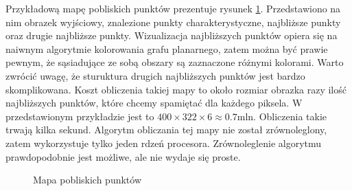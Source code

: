 \documentclass[a4paper,12pt,leqno]{article}
\begin{document}
Przykładową mapę pobliskich punktów prezentuje rysunek \ref{proxmap}. Przedstawiono na nim obrazek wyjściowy, znalezione punkty charakterystyczne, najbliższe punkty oraz drugie najbliższe
punkty. Wizualizacja najbliższych punktów opiera się na naiwnym algorytmie kolorowania grafu planarnego, zatem można być prawie pewnym, że sąsiadujące ze sobą obszary są zaznaczone
różnymi kolorami. Warto zwrócić uwagę, że sturuktura drugich najbliższych punktów jest bardzo skomplikowana. Koszt obliczenia takiej mapy to około rozmiar obrazka razy ilość najbliższych
punktów, które chcemy spamiętać dla każdego piksela. W przedstawionym przykładzie jest to $400 \times 322 \times 6 \approx 0.7 \text{mln}$. Obliczenia takie trwają kilka sekund. Algorytm 
obliczania tej mapy nie został zrównoleglony, zatem wykorzystuje tylko jeden rdzeń procesora. Zrównoleglenie algorytmu prawdopodobnie jest możliwe, ale nie wydaje się proste.

\begin{figure}\centering
{}\hspace{1mm}
\hspace{1mm}
\hspace{1mm}
\caption{Mapa pobliskich punktów}{\label{proxmap}}
\end{figure}
\end{document}
